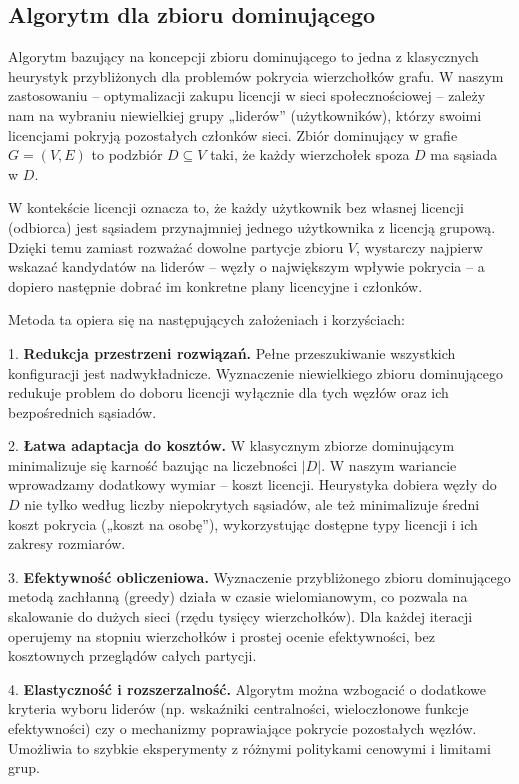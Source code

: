 \subsection{Algorytm dla zbioru dominującego}

Algorytm bazujący na koncepcji zbioru dominującego to jedna z klasycznych heurystyk przybliżonych dla problemów pokrycia wierzchołków grafu. W naszym zastosowaniu – optymalizacji zakupu licencji w sieci społecznościowej – zależy nam na wybraniu niewielkiej grupy „liderów” (użytkowników), którzy swoimi licencjami pokryją pozostałych członków sieci. Zbiór dominujący w grafie $G=(V,E)$ to podzbiór $D\subseteq V$ taki, że każdy wierzchołek spoza $D$ ma sąsiada w $D$.  

W kontekście licencji oznacza to, że każdy użytkownik bez własnej licencji (odbiorca) jest sąsiadem przynajmniej jednego użytkownika z licencją grupową. Dzięki temu zamiast rozważać dowolne partycje zbioru $V$, wystarczy najpierw wskazać kandydatów na liderów – węzły o największym wpływie pokrycia – a dopiero następnie dobrać im konkretne plany licencyjne i członków.  

Metoda ta opiera się na następujących założeniach i korzyściach:

1. \textbf{Redukcja przestrzeni rozwiązań.} Pełne przeszukiwanie wszystkich konfiguracji jest nadwykładnicze. Wyznaczenie niewielkiego zbioru dominującego redukuje problem do doboru licencji wyłącznie dla tych węzłów oraz ich bezpośrednich sąsiadów.

2. \textbf{Łatwa adaptacja do kosztów.} W klasycznym zbiorze dominującym minimalizuje się karność bazując na liczebności $|D|$. W naszym wariancie wprowadzamy dodatkowy wymiar – koszt licencji. Heurystyka dobiera węzły do $D$ nie tylko według liczby niepokrytych sąsiadów, ale też minimalizuje średni koszt pokrycia („koszt na osobę”), wykorzystując dostępne typy licencji i ich zakresy rozmiarów.

3. \textbf{Efektywność obliczeniowa.} Wyznaczenie przybliżonego zbioru dominującego metodą zachłanną (greedy) działa w czasie wielomianowym, co pozwala na skalowanie do dużych sieci (rzędu tysięcy wierzchołków). Dla każdej iteracji operujemy na stopniu wierzchołków i prostej ocenie efektywności, bez kosztownych przeglądów całych partycji.

4. \textbf{Elastyczność i rozszerzalność.} Algorytm można wzbogacić o dodatkowe kryteria wyboru liderów (np. wskaźniki centralności, wieloczłonowe funkcje efektywności) czy o mechanizmy poprawiające pokrycie pozostałych węzłów. Umożliwia to szybkie eksperymenty z różnymi politykami cenowymi i limitami grup.

